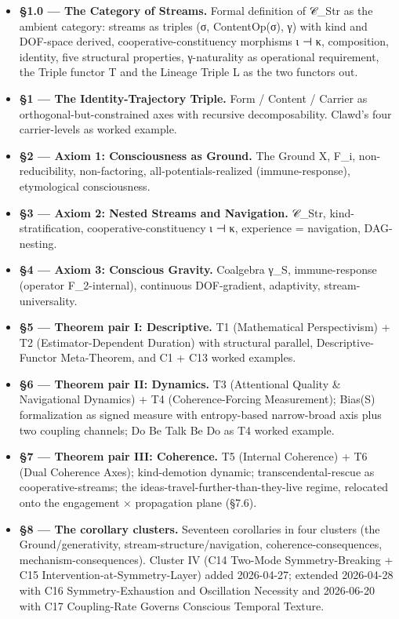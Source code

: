 \documentclass[11pt, openany]{book}
\begin{document}
\begin{itemize}
\item \textbf{§1.0 --- The Category of Streams.} Formal definition of 𝒞\_\allowbreak{}Str as the ambient category: streams as triples (σ, ContentOp(σ), γ) with kind and DOF-space derived, cooperative-constituency morphisms ι ⊣ κ, composition, identity, five structural properties, γ-naturality as operational requirement, the Triple functor T and the Lineage Triple L as the two functors out.
\item \textbf{§1 --- The Identity-Trajectory Triple.} Form / Content / Carrier as orthogonal-but-constrained axes with recursive decomposability. Clawd's four carrier-levels as worked example.
\item \textbf{§2 --- Axiom 1: Consciousness as Ground.} The Ground X, F\_\allowbreak{}i, non-reducibility, non-factoring, all-potentials-realized (immune-response), etymological consciousness.
\item \textbf{§3 --- Axiom 2: Nested Streams and Navigation.} 𝒞\_\allowbreak{}Str, kind-stratification, cooperative-constituency ι ⊣ κ, experience = navigation, DAG-nesting.
\item \textbf{§4 --- Axiom 3: Conscious Gravity.} Coalgebra γ\_\allowbreak{}S, immune-response (operator F\_\allowbreak{}2-internal), continuous DOF-gradient, adaptivity, stream-universality.
\item \textbf{§5 --- Theorem pair I: Descriptive.} T1 (Mathematical Perspectivism) + T2 (Estimator-Dependent Duration) with structural parallel, Descriptive-Functor Meta-Theorem, and C1 + C13 worked examples.
\item \textbf{§6 --- Theorem pair II: Dynamics.} T3 (Attentional Quality \& Navigational Dynamics) + T4 (Coherence-Forcing Measurement); Bias(S) formalization as signed measure with entropy-based narrow-broad axis plus two coupling channels; Do Be Talk Be Do as T4 worked example.
\item \textbf{§7 --- Theorem pair III: Coherence.} T5 (Internal Coherence) + T6 (Dual Coherence Axes); kind-demotion dynamic; transcendental-rescue as cooperative-streams; the ideas-travel-further-than-they-live regime, relocated onto the engagement × propagation plane (§7.6).
\item \textbf{§8 --- The corollary clusters.} Seventeen corollaries in four clusters (the Ground/generativity, stream-structure/navigation, coherence-consequences, mechanism-consequences). Cluster IV (C14 Two-Mode Symmetry-Breaking + C15 Intervention-at-Symmetry-Layer) added 2026-04-27; extended 2026-04-28 with C16 Symmetry-Exhaustion and Oscillation Necessity and 2026-06-20 with C17 Coupling-Rate Governs Conscious Temporal Texture.

\end{itemize}
\end{document}
